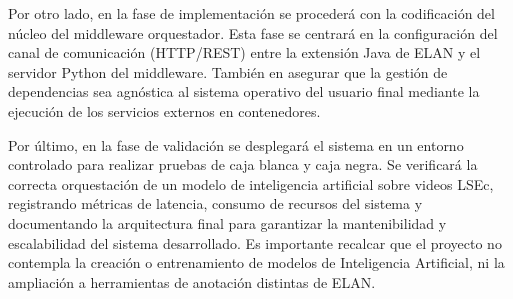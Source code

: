 Por otro lado, en la fase de implementación se procederá con la codificación del núcleo del middleware orquestador. Esta fase se centrará en la configuración del canal de comunicación (HTTP/REST) entre la extensión Java de ELAN y el servidor Python del middleware. También en asegurar que la gestión de dependencias sea agnóstica al sistema operativo del usuario final mediante la ejecución de los servicios externos en contenedores. 

Por último, en la fase de validación se desplegará el sistema en un entorno controlado para realizar pruebas de caja blanca y caja negra. Se verificará la correcta orquestación de un modelo de inteligencia artificial sobre videos LSEc, registrando métricas de latencia, consumo de recursos del sistema y documentando la arquitectura final para garantizar la mantenibilidad y escalabilidad del sistema desarrollado. Es importante recalcar que el proyecto no contempla la creación o entrenamiento de modelos de Inteligencia Artificial, ni la ampliación a herramientas de anotación distintas de ELAN.\vspace{1\baselineskip}